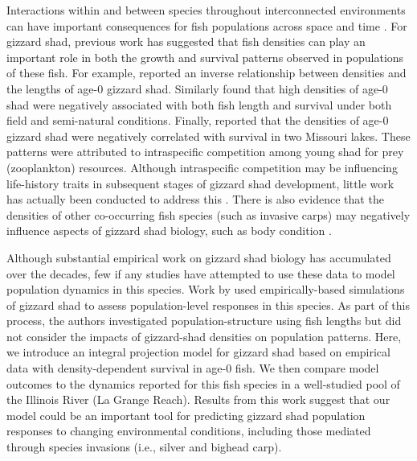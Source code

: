 \documentclass[preprint,review,12pt,authoryear]{elsarticle}
\begin{document}
Interactions within and between species throughout interconnected environments can have important consequences for fish populations across space and time \citep{thorp2006riverine}.  
For gizzard shad, previous work has suggested that fish densities can play an important role in both the growth and survival patterns observed in populations of these fish.  
For example, \citep{buynak1992differential} reported an inverse relationship between densities and the lengths of age-0 gizzard shad.  Similarly \citep{welker1994growth} found that high densities of age-0 shad were negatively associated with both fish length and survival under both field and semi-natural conditions. Finally, \citep{michaletz2010overwinter} reported that the densities of age-0 gizzard shad were negatively correlated with survival in two Missouri lakes.  
These patterns were attributed to intraspecific competition among young shad for prey (zooplankton) resources. Although intraspecific competition may be influencing life-history traits in subsequent stages of gizzard shad development, little work has actually been conducted to address this \citep{dicenzo1996relations}. 
There is also evidence that the densities of other co-occurring fish species (such as invasive carps) may negatively influence aspects of gizzard shad biology, such as body condition \citep{irons2007reduced,love2018does}.

Although substantial empirical work on gizzard shad biology has accumulated over the decades, few if any studies have attempted to use these data to model population dynamics in this species.
Work by \citet{catalano2010size, catalano2011whole} used empirically-based simulations of gizzard shad to assess population-level responses in this species.
As part of this process, the authors investigated population-structure using fish lengths but did
not consider the impacts of gizzard-shad densities on population patterns.
Here, we introduce an integral projection model for gizzard shad based on empirical data with density-dependent survival in age-0 fish.
We then compare model outcomes to the dynamics reported for this fish species in a well-studied pool of the Illinois River (La Grange Reach).
Results from this work suggest that our model could be an important tool for predicting gizzard shad population responses to changing environmental conditions, including those mediated through species invasions (i.e., silver and bighead carp).
\end{document}
